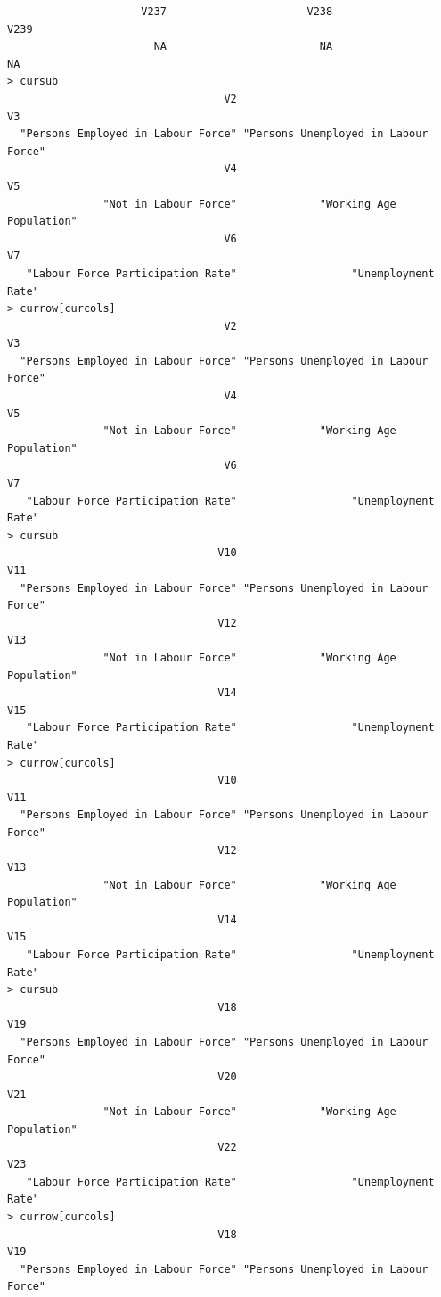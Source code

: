 \documentclass[a4paper]{article}
\begin{document}
\begin{verbatim}
                     V237                      V238                      V239 
                       NA                        NA                        NA 
> cursub 
                                  V2                                   V3 
  "Persons Employed in Labour Force" "Persons Unemployed in Labour Force" 
                                  V4                                   V5 
               "Not in Labour Force"             "Working Age Population" 
                                  V6                                   V7 
   "Labour Force Participation Rate"                  "Unemployment Rate" 
> currow[curcols] 
                                  V2                                   V3 
  "Persons Employed in Labour Force" "Persons Unemployed in Labour Force" 
                                  V4                                   V5 
               "Not in Labour Force"             "Working Age Population" 
                                  V6                                   V7 
   "Labour Force Participation Rate"                  "Unemployment Rate" 
> cursub 
                                 V10                                  V11 
  "Persons Employed in Labour Force" "Persons Unemployed in Labour Force" 
                                 V12                                  V13 
               "Not in Labour Force"             "Working Age Population" 
                                 V14                                  V15 
   "Labour Force Participation Rate"                  "Unemployment Rate" 
> currow[curcols] 
                                 V10                                  V11 
  "Persons Employed in Labour Force" "Persons Unemployed in Labour Force" 
                                 V12                                  V13 
               "Not in Labour Force"             "Working Age Population" 
                                 V14                                  V15 
   "Labour Force Participation Rate"                  "Unemployment Rate" 
> cursub 
                                 V18                                  V19 
  "Persons Employed in Labour Force" "Persons Unemployed in Labour Force" 
                                 V20                                  V21 
               "Not in Labour Force"             "Working Age Population" 
                                 V22                                  V23 
   "Labour Force Participation Rate"                  "Unemployment Rate" 
> currow[curcols] 
                                 V18                                  V19 
  "Persons Employed in Labour Force" "Persons Unemployed in Labour Force" 

\end{verbatim}
\end{document}
